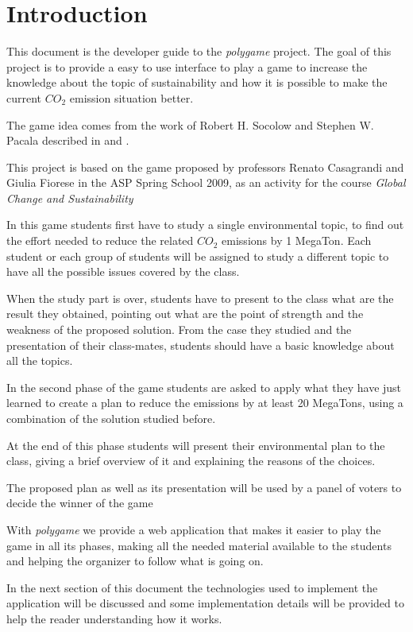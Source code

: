 \section{Introduction}
This document is the developer guide to the \emph{polygame} project. The goal of this project is to provide a easy to use interface to play a game to increase the knowledge about the topic of sustainability and how it is possible to make the current \emph{$CO_2$} emission situation better.


The game idea comes from the work of Robert H. Socolow and Stephen W. Pacala described in \cite{scientificAmerican} and \cite{science}.

This project is based on the game proposed by professors Renato Casagrandi and Giulia Fiorese in the ASP Spring School 2009, as an activity for the course \emph{Global Change and Sustainability}

In this game students first have to study a single environmental topic, to find out the effort needed to reduce the related \emph{$CO_2$} emissions by 1 MegaTon. Each student or each group of students will be assigned to study a different topic to have all the possible issues covered by the class.

When the study part is over, students have to present to the class what are the result they obtained, pointing out what are the point of strength and the weakness of the proposed solution. From  the case they studied and the presentation of their class-mates, students should have a basic knowledge about all the topics.

In the second phase of the game students are asked to apply what they have just learned to create a plan to reduce the emissions by at least 20 MegaTons, using a combination of the solution studied before.

At the end of this phase students will present their environmental plan to the class, giving a brief overview of it and explaining the reasons of the choices.

The proposed plan as well as its presentation will be used by a panel of voters to decide the winner of the game

With \emph{polygame} we provide a web application that makes it easier to play the game in all its phases, making all the needed material available to the students and helping the organizer to follow what is going on.

In the next section of this document the technologies used to implement the application will be discussed and some implementation details will be provided to help the reader understanding how it works.